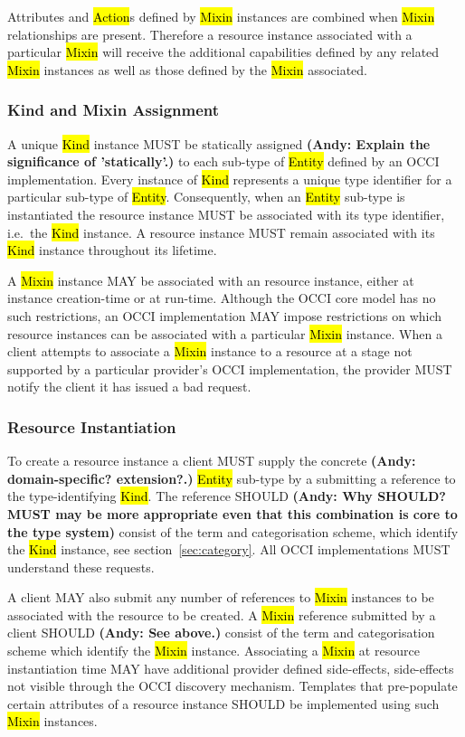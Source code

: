 \documentclass[10pt,a4paper]{article}
\begin{document}
Attributes and \hl{Action}s defined by \hl{Mixin} instances are combined when
\hl{Mixin} relationships are present. Therefore a resource instance associated
with a particular \hl{Mixin} will receive the additional capabilities defined
by any related \hl{Mixin} instances as well as those defined by the \hl{Mixin}
associated.

\subsubsection{Kind and Mixin Assignment}
\label{sec:assignment}

A unique \hl{Kind} instance MUST be statically assigned \textbf{(Andy: Explain the significance of 'statically'.)} 
to each sub-type of
\hl{Entity} defined by an OCCI implementation. Every instance of \hl{Kind}
represents a unique type identifier for a particular sub-type of \hl{Entity}.
Consequently, when an \hl{Entity} sub-type is instantiated the resource instance
MUST be associated with its type identifier, i.e.~the \hl{Kind} instance.
A resource instance MUST remain associated with its \hl{Kind} instance throughout
its lifetime.

A \hl{Mixin} instance MAY be associated with an resource instance, either at
instance creation-time or at run-time. Although the OCCI core model has no such
restrictions, an OCCI implementation MAY impose restrictions on which resource
instances can be associated with a particular \hl{Mixin} instance.
%
When a client attempts to associate a \hl{Mixin} instance to a resource at a
stage not supported by a particular provider's OCCI implementation, the
provider MUST notify the client it has issued a bad request.

\subsubsection{Resource Instantiation}
\label{sec:instantiation}
To create a resource instance a client MUST supply the concrete \textbf{(Andy: domain-specific? extension?.)} 
\hl{Entity} sub-type by a submitting a reference to the type-identifying \hl{Kind}. The
reference SHOULD \textbf{(Andy: Why SHOULD? MUST may be more 
appropriate even that this combination is core to the type system)} consist of the term 
and categorisation scheme, which
identify the \hl{Kind} instance, see section~\ref{sec:category}.
All OCCI implementations MUST understand these requests.

A client MAY also submit any number of references to \hl{Mixin} instances to be
associated with the resource to be created. A \hl{Mixin} reference submitted by
a client SHOULD \textbf{(Andy: See above.)} consist of the term and categorisation scheme which identify
the \hl{Mixin} instance. 
Associating a \hl{Mixin} at resource
instantiation time MAY have additional provider defined side-effects,
side-effects not visible through the OCCI discovery mechanism. Templates that
pre-populate certain attributes of a resource instance SHOULD be implemented
using such \hl{Mixin} instances.
\end{document}
